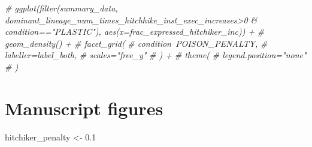 \documentclass[]{book}
\newenvironment{Shaded}{\begin{snugshade}}{\end{snugshade}}
\newcommand{\CommentTok}[1]{\textcolor[rgb]{0.56,0.35,0.01}{\textit{#1}}}
\newcommand{\FloatTok}[1]{\textcolor[rgb]{0.00,0.00,0.81}{#1}}
\newcommand{\NormalTok}[1]{#1}
\newcommand{\StringTok}[1]{\textcolor[rgb]{0.31,0.60,0.02}{#1}}
\begin{document}
\begin{Shaded}
\begin{Highlighting}[]
\CommentTok{# ggplot(filter(summary_data, dominant_lineage_num_times_hitchhike_inst_exec_increases>0 & condition=="PLASTIC"), aes(x=frac_expressed_hitchiker_inc)) +}
\CommentTok{#   geom_density() +}
\CommentTok{#   facet_grid(}
\CommentTok{#     condition~POISON_PENALTY,}
\CommentTok{#     labeller=label_both,}
\CommentTok{#     scales="free_y"}
\CommentTok{#   ) +}
\CommentTok{#   theme(}
\CommentTok{#     legend.position="none"}
\CommentTok{#   )}
\end{Highlighting}
\end{Shaded}

\hypertarget{manuscript-figures-2}{%
\section{Manuscript figures}\label{manuscript-figures-2}}

\begin{Shaded}
\begin{Highlighting}[]
\NormalTok{hitchiker_penalty <-}\StringTok{ }\FloatTok{0.1}
\end{Highlighting}
\end{Shaded}
\end{document}
